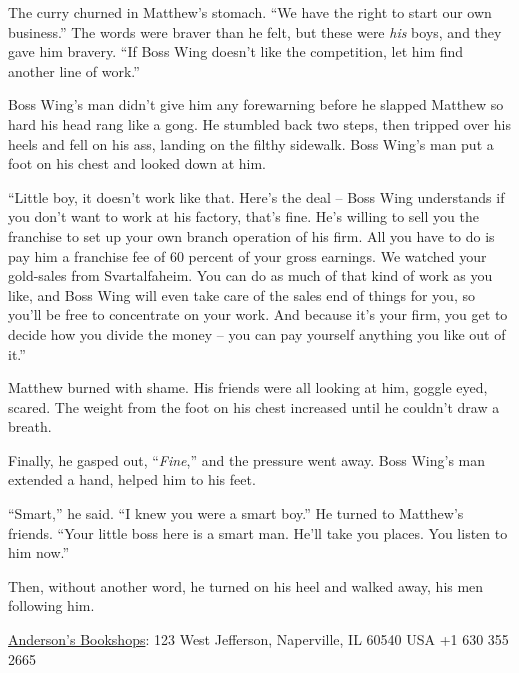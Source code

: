 The curry churned in Matthew's stomach. ``We have the right to start
our own business.'' The words were braver than he felt, but these
were \emph{his} boys, and they gave him bravery. ``If Boss Wing
doesn't like the competition, let him find another line of work.''

Boss Wing's man didn't give him any forewarning before he slapped
Matthew so hard his head rang like a gong. He stumbled back two
steps, then tripped over his heels and fell on his ass, landing on
the filthy sidewalk. Boss Wing's man put a foot on his chest and
looked down at him.

``Little boy, it doesn't work like that. Here's the deal -- Boss
Wing understands if you don't want to work at his factory, that's
fine. He's willing to sell you the franchise to set up your own
branch operation of his firm. All you have to do is pay him a
franchise fee of 60 percent of your gross earnings. We watched your
gold-sales from Svartalfaheim. You can do as much of that kind of
work as you like, and Boss Wing will even take care of the sales
end of things for you, so you'll be free to concentrate on your
work. And because it's your firm, you get to decide how you divide
the money -- you can pay yourself anything you like out of it.''

Matthew burned with shame. His friends were all looking at him,
goggle eyed, scared. The weight from the foot on his chest
increased until he couldn't draw a breath.

Finally, he gasped out, ``\emph{Fine},'' and the pressure went away.
Boss Wing's man extended a hand, helped him to his feet.

``Smart,'' he said. ``I knew you were a smart boy.'' He turned to
Matthew's friends. ``Your little boss here is a smart man. He'll
take you places. You listen to him now.''

Then, without another word, he turned on his heel and walked away,
his men following him.

\tb

{\href{http://site.booksite.com/5156/search/?q=for\%20the\%20win\%20doctorow\&search=yes\&custcat=}{Anderson's Bookshops}: 123 West Jefferson, Naperville, IL 60540 USA +1 630 355 2665}

